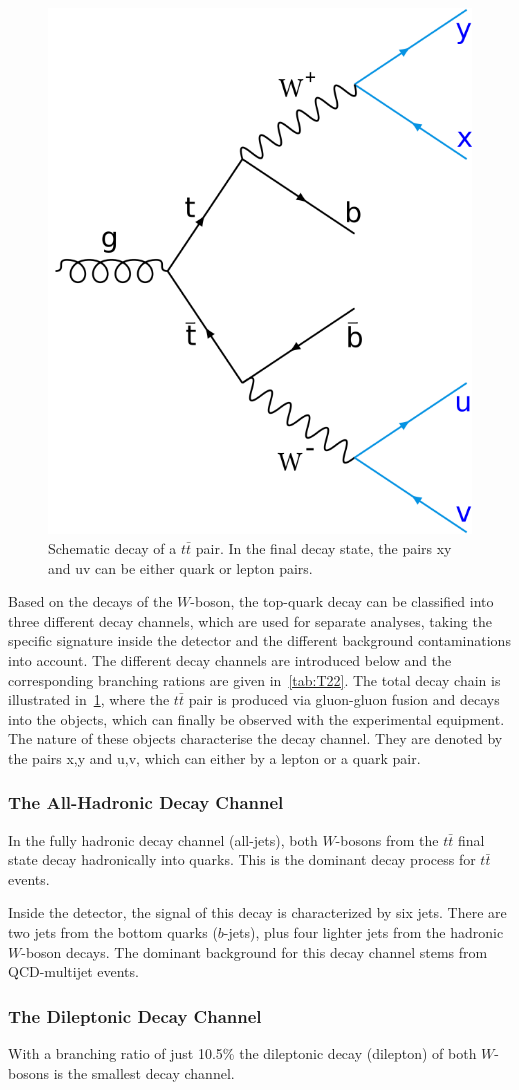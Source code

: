 \begin{figure}[h]
	\centering
	\includegraphics[width=0.3\linewidth]{Pics/cp1/Decay}
	\caption{Schematic decay of a $t\bar{t}$ pair. In the final decay state, the pairs xy and uv can be either quark or lepton pairs.  }
	\label{fig:Decay}
\end{figure}

 Based on the decays of the $W$-boson, the top-quark decay can be classified into three different decay channels, which are used for separate analyses, taking the specific signature inside the detector and the different background contaminations into account. The different decay channels are introduced below and  the corresponding branching rations are given in~\cref{tab:T22}. The total decay chain is illustrated in~\cref{fig:Decay}, where the  $t\bar{t}$ pair is produced via  gluon-gluon fusion and  decays into the objects, which can finally be observed with the experimental equipment. The nature of these objects characterise the decay channel. They are denoted by the pairs x,y and u,v, which can either by a lepton or a quark pair.




\subsubsection{The All-Hadronic Decay Channel}
In the fully hadronic decay channel (all-jets), both $W$-bosons from the $t\bar{t}$ final state decay hadronically into quarks. This is the dominant decay process for $t\bar{t}$ events. 

 Inside the detector, the signal of this decay is characterized by six jets. There are two jets  from the bottom quarks ($b$-jets), plus four lighter jets from the hadronic $W$-boson decays. The dominant background  for this decay channel stems from QCD-multijet events.

\subsubsection{The Dileptonic Decay Channel}
With a branching ratio of just 10.5\% the dileptonic decay (dilepton) of both $W$-bosons is the smallest decay channel. 

